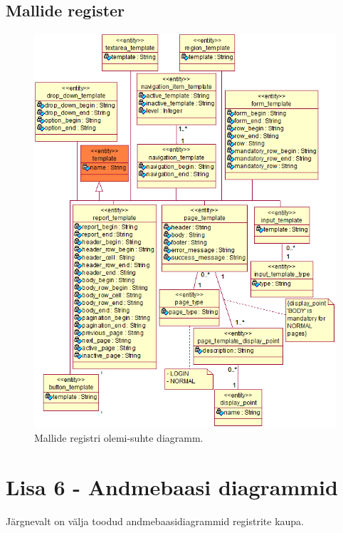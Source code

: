 \documentclass[a4paper,12pt]{article} %
\begin{document}
\subsection*{Mallide register}
\begin{figure}[H]
\centering
\includegraphics[width=\textwidth]{./diagrams/template-er-diagram.png}
\caption{Mallide registri olemi-suhte diagramm.}
\label{fig_mallide_registri_olemi_suhte_diagramm}
\end{figure}

\section*{Lisa 6 - Andmebaasi diagrammid}
\label{lisa_andmebaasi_diagrammid}
Järgnevalt on välja toodud andmebaasidiagrammid registrite kaupa.
\end{document}
